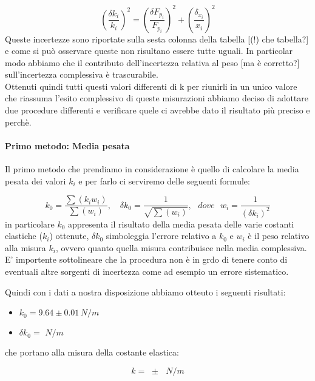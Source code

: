 \begin{equation*}
	\left(\frac{\delta {k_{i}}}{k_{i}}\right)^2  =  \left(\frac{\delta F_{p_{i}}}{F_{p_{i}}}\right)^2  +  \left(\frac{\delta_{x_{i}}}{x_{i}}\right)^2 
\end{equation*}
%
Queste incertezze sono riportate sulla sesta colonna della tabella [(!) che tabella?] e come si può osservare queste non risultano essere tutte uguali. In particolar modo abbiamo che il contributo dell'incertezza relativa al peso [ma è corretto?] sull'incertezza complessiva è trascurabile.\\
Ottenuti quindi tutti questi valori differenti di k per riunirli in un unico valore che riassuma l'esito complessivo di queste misurazioni abbiamo deciso di adottare due procedure differenti e verificare quele ci avrebbe dato il risultato più preciso e perchè.

\paragraph{Primo metodo: Media pesata\\}
Il primo metodo che prendiamo in considerazione è quello di calcolare la media pesata dei valori $k_{i}$ e per farlo ci serviremo delle seguenti formule:

\begin{equation*}
		k_{0} = \frac{\sum (k_i w_i)}{\sum (w_i)} , \,\,\,\,\,\, \delta k_0 = \frac{1}{\sqrt{\sum (w_i)}} , \,\,\,\,dove\,\,\,\, w_i = \frac{1}{(\delta k_i)^2}
\end{equation*}
%
in particolare $k_0$ appresenta il risultato della media pesata delle varie costanti elastiche ($k_i$) ottenute, $\delta k_0$ simboleggia l'errore relativo a $k_0$ e $w_i$ è il peso relativo alla misura $k_i$, ovvero quanto quella misura contribuisce nella media complessiva. E' importente sottolineare che la procedura non è in grdo di tenere conto di eventuali altre sorgenti di incertezza come ad esempio un errore sistematico.

Quindi con i dati a nostra disposizione abbiamo otteuto i seguenti risultati:
\begin{itemize}
	\item{  $  k_{0} =  9.64 \pm 0.01 \, N/m$  }
	\item{  $  \delta k_0 =  \,\, N/m  $  }
\end{itemize}
che portano alla misura della costante elastica:

\begin{equation}
		k =  \,\, \pm \,\, \,\,N/m
\end{equation}

